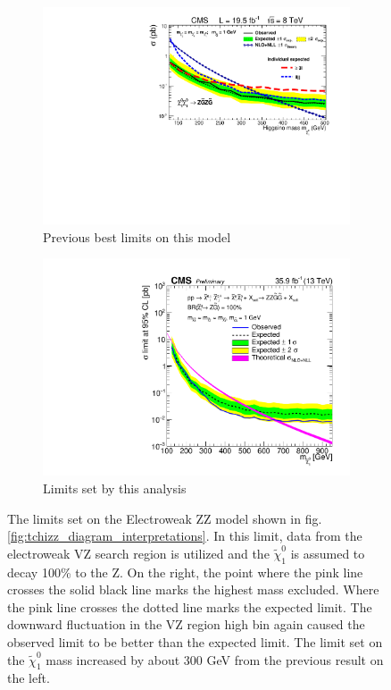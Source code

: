     \begin{figure}[!h]
      \centering
        \begin{subfigure}[b]{0.4\textwidth}
          \label{fig:t5zz_interpretations_2015}
          \includegraphics[width=\textwidth]{figures/interpretations/TChiZZ_previous_best.pdf}
          \caption{Previous best limits on this model}
        \end{subfigure}
        \begin{subfigure}[b]{0.4\textwidth}
          \label{fig:t5zz_interpretations_current}
          \includegraphics[width=\textwidth]{figures/interpretations/TChiZZ_Exclusion_13TeV.pdf}
          \caption{Limits set by this analysis}
        \end{subfigure}
      \caption{ \label{fig:tchizz_interpretation}
        The limits set on the Electroweak ZZ model shown in fig. \ref{fig:tchizz_diagram_interpretations}. In this limit, data from the electroweak VZ search region is utilized and the $\widetilde{\chi}^0_1$ is assumed to decay 100\% to the Z. On the right, the point where the pink line crosses the solid black line marks the highest mass excluded. Where the pink line crosses the dotted line marks the expected limit. The downward fluctuation in the VZ region high \MET bin again caused the observed limit to be better than the expected limit. The limit set on the $\widetilde{\chi}^0_1$ mass increased by about 300 GeV from the previous result on the left.
      }
    \end{figure}

